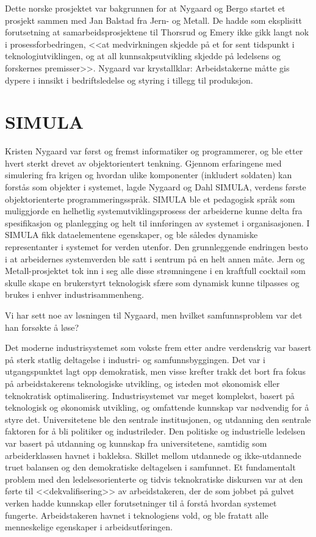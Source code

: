 Dette norske prosjektet var bakgrunnen for at Nygaard og Bergo startet et prosjekt sammen med Jan Balstad fra Jern- og Metall. De hadde som eksplisitt forutsetning at samarbeidsprosjektene til Thorsrud og Emery ikke gikk langt nok i prosessforbedringen, <<at medvirkningen skjedde på et for sent tidspunkt i teknologiutviklingen, og at all kunnsakpsutvikling skjedde på ledelsens og forskernes premisser>>. Nygaard var krystallklar: Arbeidstakerne måtte gis dypere i innsikt i bedriftsledelse og styring i tillegg til produksjon.

\section{SIMULA}

Kristen Nygaard var først og fremst informatiker og programmerer, og ble etter hvert sterkt drevet av objektorientert tenkning. Gjennom erfaringene med simulering fra krigen og hvordan ulike komponenter (inkludert soldaten) kan forstås som objekter i systemet, lagde Nygaard og Dahl SIMULA, verdens første objektorienterte programmeringsspråk. SIMULA ble et pedagogisk språk som muliggjorde en helhetlig systemutviklingsprosess der arbeiderne kunne delta fra spesifikasjon og planlegging og helt til innføringen av systemet i organisasjonen. I SIMULA fikk dataelementene egenskaper, og ble således dynamiske representanter i systemet for verden utenfor. Den grunnleggende endringen besto i at arbeidernes systemverden ble satt i sentrum på en helt annen måte. Jern og Metall-prosjektet tok inn i seg alle disse strømningene i en kraftfull cocktail som skulle skape en brukerstyrt teknologisk sfære som dynamisk kunne tilpasses og brukes i enhver industrisammenheng.

Vi har sett noe av løsningen til Nygaard, men hvilket samfunnsproblem var det han forsøkte å løse?

Det moderne industrisystemet som vokste frem etter andre verdenskrig var basert på sterk statlig deltagelse i industri- og samfunnsbyggingen. Det var i utgangspunktet lagt opp demokratisk, men visse krefter trakk det bort fra fokus på arbeidstakerens teknologiske utvikling, og isteden mot økonomisk eller teknokratisk optimalisering. Industrisystemet var meget komplekst, basert på teknologisk og økonomisk utvikling, og omfattende kunnskap var nødvendig for å styre det. Universitetene ble den sentrale institusjonen, og utdanning den sentrale faktoren for å bli politiker og industrileder. Den politiske og industrielle ledelsen var basert på utdanning og kunnskap fra universitetene, samtidig som arbeiderklassen havnet i bakleksa. Skillet mellom utdannede og ikke-utdannede truet balansen og den demokratiske deltagelsen i samfunnet. Et fundamentalt problem med den ledelsesorienterte og tidvis teknokratiske diskursen var at den førte til <<dekvalifisering>> av arbeidstakeren, der de som jobbet på gulvet verken hadde kunnskap eller forutsetninger til å forstå hvordan systemet fungerte. Arbeidstakeren havnet i teknologiens vold, og ble fratatt alle menneskelige egenskaper i arbeidsutføringen.

